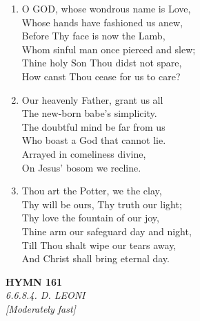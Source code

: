 \begin{enumerate}
    \item O GOD, whose wondrous name is Love, \\
        Whose hands have fashioned us anew, \\
        Before Thy face is now the Lamb, \\
        Whom sinful man once pierced and slew; \\
        Thine holy Son Thou didst not spare, \\
        How canst Thou cease for us to care?

    \item Our heavenly Father, grant us all \\
        The new-born babe's simplicity. \\
        The doubtful mind be far from us \\
        Who boast a God that cannot lie. \\
        Arrayed in comeliness divine, \\
        On Jesus' bosom we recline.

    \item Thou art the Potter, we the clay, \\
        Thy will be ours, Thy truth our light; \\
        Thy love the fountain of our joy, \\
        Thine arm our safeguard day and night, \\
        Till Thou shalt wipe our tears away, \\
        And Christ shall bring eternal day.

\end{enumerate}

\newpage
\begin{center}
    {\Large \textbf{HYMN 161}}
    \\
    \textit{6.6.8.4. D. LEONI}
    \\
    \textit{\small [Moderately fast]}
\end{center}
\vspace{1em}

